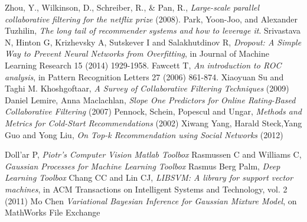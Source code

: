 \documentclass[10pt,a4paper]{article}
\begin{document}
    \begin{thebibliography}{99}

       Zhou, Y., Wilkinson, D., Schreiber, R., \& Pan, R., \textit{Large-scale parallel collaborative filtering for the netflix prize} (2008).
       Park, Yoon-Joo, and Alexander Tuzhilin, \textit{The long tail of recommender systems and how to leverage it}.
       Srivastava N, Hinton G, Krizhevsky A, Sutskever I and Salakhutdinov R, \textit{Dropout: A Simple Way to Prevent Neural Networks from Overfitting}, in Journal of Machine Learning Research 15 (2014) 1929-1958.
       Fawcett T, \textit{An introduction to ROC analysis}, in Pattern Recognition Letters 27 (2006) 861-874.
       Xiaoyuan Su and Taghi M. Khoshgoftaar, \textit{A Survey of Collaborative Filtering Techniques} (2009)
       Daniel Lemire, Anna Maclachlan, \textit{Slope One Predictors for Online Rating-Based Collaborative Filtering} (2007)
       Pennock, Schein, Popescul and Ungar, \textit{Methods and Metrics for Cold-Start Recommendations} (2002)
       Xiwang Yang, Harald Steck,Yang Guo and Yong Liu, \textit{On Top-k Recommendation using Social Networks} (2012)

       Doll'ar P, \textit{Piotr's Computer Vision Matlab Toolbox}
       Rasmussen C and Williams C, \textit{Gaussian Processes for Machine Learning Toolbox}
       Rasmus Berg Palm, \textit{Deep Learning Toolbox}
       Chang CC and Lin CJ, \textit{LIBSVM: A library for support vector machines}, in ACM Transactions on Intelligent Systems and Technology, vol. 2 (2011)
       Mo Chen \textit{Variational Bayesian Inference for Gaussian Mixture Model}, on MathWorks File Exchange

    \end{thebibliography}
\end{document}
